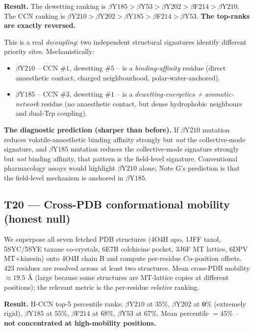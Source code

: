 \documentclass[11pt,a4paper]{article}
\begin{document}
\textbf{Result.} The dewetting ranking is
$\beta$Y$185 > \beta$Y$53 > \beta$Y$202 > \beta$F$214 > \beta$Y$210$.
The CCN ranking is
$\beta$Y$210 > \beta$Y$202 > \beta$Y$185 > \beta$F$214 > \beta$Y$53$.
\textbf{The top-ranks are exactly reversed.}

This is a real \emph{decoupling}: two independent structural signatures
identify different priority sites. Mechanistically:

\begin{itemize}\itemsep0pt
  \item $\beta$Y$210$ -- CCN \#$1$, dewetting \#$5$ -- is a \emph{binding-affinity}
    residue (direct anaesthetic contact, charged neighbourhood,
    polar-water-anchored).
  \item $\beta$Y$185$ -- CCN \#$3$, dewetting \#$1$ -- is a \emph{dewetting-energetics
    + aromatic-network} residue (no anaesthetic contact, but dense
    hydrophobic neighbours and dual-Trp coupling).
\end{itemize}

\textbf{The diagnostic prediction (sharper than before).} If
$\beta$Y$210$ mutation reduces volatile-anaesthetic binding affinity
strongly but \emph{not} the collective-mode signature, and $\beta$Y$185$
mutation reduces the collective-mode signature strongly but \emph{not}
binding affinity, that pattern is the field-level signature.
Conventional pharmacology assays would highlight $\beta$Y$210$ alone;
Note G's prediction is that the field-level mechanism is anchored in
$\beta$Y$185$.

\subsection{\textsf{T20} --- Cross-PDB conformational mobility (honest null)}\label{ssec:t20}

We superpose all seven fetched PDB structures (4O4H apo, 1JFF taxol,
5SYC/5SYE taxane co-crystals, 6E7B colchicine pocket, 3J6F MT lattice,
6DPV MT$+$kinesin) onto 4O4H chain B and compute per-residue
$C\alpha$-position offsets. 423 residues are resolved across at least
two structures. Mean cross-PDB mobility $\approx 19.5$ \AA{} (large
because some structures are MT-lattice copies at different positions);
the relevant metric is the per-residue \emph{relative} ranking.

\textbf{Result.} H-CCN top-5 percentile ranks: $\beta$Y$210$ at $35\%$,
$\beta$Y$202$ at $\mathbf{0\%}$ (extremely rigid), $\beta$Y$185$ at
$55\%$, $\beta$F$214$ at $68\%$, $\beta$Y$53$ at $67\%$. Mean
percentile $= 45\%$ -- \textbf{not concentrated at high-mobility positions.}
\end{document}
